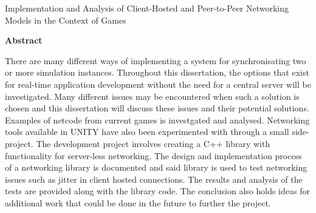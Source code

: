 \thispagestyle{plain}
\begin{center}
  \makeatletter
  \Large
  \textbf{\@title}

  \vspace*{0.4cm}
  \large
  Implementation and Analysis of Client-Hosted and Peer-to-Peer Networking Models in the Context of Games

  \vspace*{0.4cm}
  \textbf{\@author}

  \vspace*{0.9cm}
  \textbf{Abstract}
  \makeatother
\end{center}
There are many different ways of implementing a system for synchronisating two or more simulation instances. Throughout this dissertation, the options that exist for real-time application development without the need for a central server will be investigated. Many different issues may be encountered when such a solution is chosen and this dissertation will discuss these issues and their potential solutions.
Examples of netcode from current games is investgated and analysed. Networking tools available in UNITY have also been experimented with through a small side-project.
The development project involves creating a C++ library with functionality for server-less networking. The design and implementation process of a networking library is documented and said library is used to test networking issues such as jitter in client hosted connections. The results and analysis of the tests are provided along with the library code. The conclusion also holds ideas for additional work that could be done in the future to further the project.
